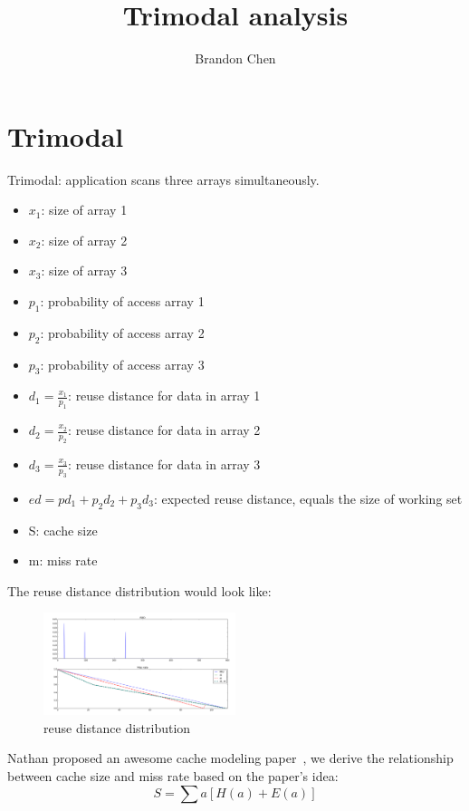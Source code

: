 \documentclass[12pt, letterpaper]{article}
\title{Trimodal analysis}
\author{Brandon Chen}
\begin{document}
\maketitle
\section{Trimodal}

Trimodal: application scans three arrays simultaneously.

\begin{itemize}
\item $x_1$: size of array 1
\item $x_2$: size of array 2
\item $x_3$: size of array 3
\item $p_1$: probability of access array 1
\item $p_2$: probability of access array 2
\item $p_3$: probability of access array 3
\item $d_1 = \frac{x_1}{p_1}$: reuse distance for data in array 1
\item $d_2 = \frac{x_2}{p_2}$: reuse distance for data in array 2
\item $d_3 = \frac{x_3}{p_3}$: reuse distance for data in array 3
\item $ed = p d_1 + p_2 d_2 + p_3 d_3 $: expected reuse distance, equals the
size of working set 
\item S: cache size
\item m: miss rate
\end{itemize}

The reuse distance distribution would look like:
\begin{figure}[H]
\centering
\includegraphics[width=0.5\textwidth]{rdd}
\caption{reuse distance distribution}
\end{figure}

Nathan proposed an awesome cache modeling paper~\cite{beckmann2016modeling}, we
derive the relationship between cache size and miss rate based on the paper's
idea:
\begin{equation}
S = \sum a [H(a) + E(a)]
\end{equation}
\end{document}
